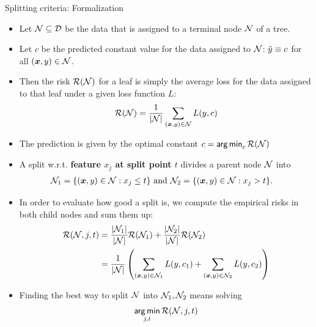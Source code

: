 \documentclass[11pt,compress,t,notes=noshow, xcolor=table]{beamer}
\begin{document}
\begin{vbframe}{Splitting criteria: Formalization}

\begin{itemize}
\item Let $\mathcal{N} \subseteq \mathcal{D}$ be the data that is assigned to a terminal node $\mathcal{N}$ of a tree.
\item Let $c$ be the predicted constant value for the data assigned to $\mathcal{N}$: $\hat{y} \equiv c$ for all $\left(\bm{x}, y\right) \in \mathcal{N}$.
\item Then the risk $\mathcal{R}(\mathcal{N})$ for a leaf is simply the average loss for the data assigned to that leaf under a given loss function $L$:
  $$\mathcal{R}(\mathcal{N}) = \frac{1}{|\mathcal{N}|} \sum\limits_{(\bm{x}, y) \in \mathcal{N}} L(y, c)$$
\item The prediction is given by the optimal constant $c = \mathop{\sf arg\,min}_c \mathcal{R}(\mathcal{N})$
\end{itemize}

\framebreak

\begin{itemize}
\item A split w.r.t. \textbf{feature $x_j$ at split point $t$} divides a parent node $\mathcal{N}$ into 
  \begin{align*}
    \mathcal{N}_1 &= \{ (\bm{x}, y) \in \mathcal{N}: x_j \leq t \} \text{ and } \mathcal{N}_2 = \{ (\bm{x}, y) \in \mathcal{N}: x_j > t \}.
  \end{align*}
\item   
  In order to evaluate how good a split is, we compute the empirical risks
  in both child nodes and sum them up:
     \begin{align*}
      \mathcal{R}(\mathcal{N}, j, t) &= \frac{|\mathcal{N}_1|}{|\mathcal{N}|} \mathcal{R}(\mathcal{N}_1) + \frac{|\mathcal{N}_2|}{|\mathcal{N}|} \mathcal{R}(\mathcal{N}_2) \\
                  &= \frac{1}{|\mathcal{N}|}\left(\sum\limits_{(\bm{x},y) \in \mathcal{N}_1} L(y, c_1) + \sum\limits_{(\bm{x},y) \in \mathcal{N}_2} L(y, c_2)\right)
      \end{align*}
  \item Finding the best way to split $\mathcal{N}$ into $\mathcal{N}_1, \mathcal{N}_2$ means solving
  $$\mathop{\sf arg\,min}_{j, t} \mathcal{R}(\mathcal{N}, j, t)$$
\end{itemize}
\end{vbframe}
\end{document}
